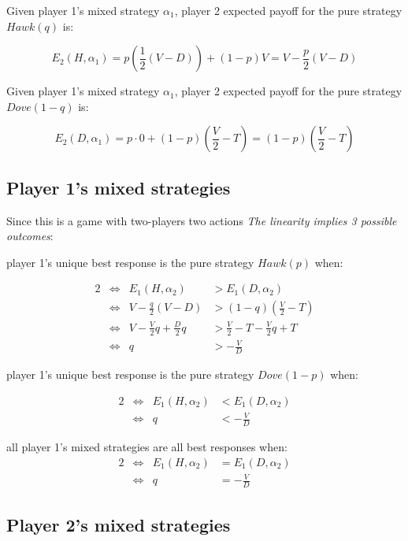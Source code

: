 \documentclass[letterpaper]{article}
\begin{document}
Given player 1’s mixed strategy $\alpha_1$, player 2 expected payoff
for the pure strategy $Hawk(q)$ is:

\begin{equation}
    E_2(H, \alpha_1) = p (\frac{1}{2}(V - D)) + (1 - p)V
    = V - \frac{p}{2}(V - D)
\end{equation}

Given player 1’s mixed strategy $\alpha_1$, player 2 expected payoff
for the pure strategy $Dove(1 - q)$ is:

\begin{equation}
    E_2(D, \alpha_1) = p \cdot 0 + (1 - p)(\frac{V}{2} - T)
    = (1 - p)(\frac{V}{2} - T)
\end{equation}

\subsection{Player 1's mixed strategies}

Since this is a game with two-players two actions
\textit{The linearity implies 3 possible outcomes}:

player 1’s unique best response is the pure strategy $Hawk(p)$ when:

    \begin{alignat*}{2}
    &\iff & E_1(H, \alpha_2) &> E_1(D, \alpha_2) \\
    &\iff &    V - \frac{q}{2}(V - D) &> (1 - q)(\frac{V}{2} - T) \\
    &\iff & V - \frac{V}{2}q + \frac{D}{2}q
    &> \frac{V}{2} - T - \frac{V}{2}q + T \\
    &\iff & q &> -\frac{V}{D}
    \end{alignat*}

player 1’s unique best response is the pure strategy $Dove(1 - p)$ when:

        \begin{alignat*}{2}
        &\iff & E_1(H, \alpha_2) &< E_1(D, \alpha_2) \\
        &\iff & q &< -\frac{V}{D}
        \end{alignat*}

all player 1’s mixed strategies are all best responses when:
        \begin{alignat*}{2}
        &\iff & E_1(H, \alpha_2) &= E_1(D, \alpha_2) \\
        &\iff & q &= -\frac{V}{D}
        \end{alignat*}


\subsection{Player 2's mixed strategies}
\end{document}
